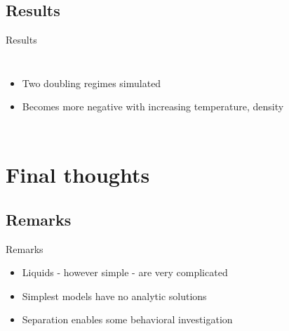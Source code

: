 \documentclass{beamer}
\begin{document}
\subsection*{Results}
\begin{frame}{Results}
\begin{columns}
	\begin{itemize}
		\item Two doubling regimes simulated
		\item Becomes more negative with increasing temperature, density 
	\end{itemize}
\end{columns}
\end{frame}

\section*{Final thoughts}
\subsection*{Remarks}
\begin{frame}{Remarks}
	\begin{itemize}
		\item Liquids - however simple - are very complicated
		\item Simplest models have no analytic solutions
		\item Separation enables some behavioral investigation
	\end{itemize}
\end{frame}
\end{document}
